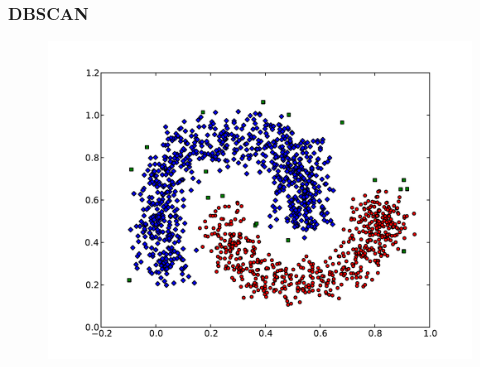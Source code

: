 \documentclass{beamer}
\begin{document}
\begin{frame}
\frametitle{DBSCAN}
    \begin{figure}[]
    \includegraphics[scale=0.3]{dbscan_half-moons.pdf}
    \end{figure}
\end{frame}
\end{document}
